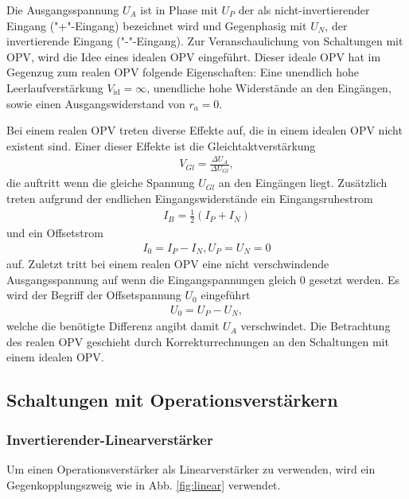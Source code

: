     Die Ausgangsspannung $U_A$ ist in Phase mit $U_P$ der als nicht-invertierender Eingang ("+"-Eingang) bezeichnet wird und Gegenphasig mit $U_N$, der invertierende Eingang ("-"-Eingang).
    Zur Veranschaulichung von Schaltungen mit OPV, wird die Idee eines idealen OPV eingeführt. Dieser ideale OPV hat im Gegenzug zum realen OPV folgende Eigenschaften:
    Eine unendlich hohe Leerlaufverstärkung $V_{\mathrm{id}}=\infty$, unendliche hohe Widerstände an den Eingängen, sowie einen Ausgangswiderstand von $r_a=0$.

    Bei einem realen OPV treten diverse Effekte auf, die in einem idealen OPV nicht existent sind.
    Einer dieser Effekte ist die Gleichtaktverstärkung
    \begin{align}
        V_{Gl} = \frac{\Delta U_A}{\Delta U_{Gl}},
    \end{align}
    die auftritt wenn die gleiche Spannung $U_{Gl}$ an den Eingängen liegt.
    Zusätzlich treten aufgrund der endlichen Eingangswiderstände ein Eingangsruhestrom
    \begin{align}
        I_B = \frac{1}{2}(I_P + I_N)
    \end{align}
    und ein Offsetstrom
    \begin{align}
        I_0 = I_P - I_N, U_P=U_N=0
    \end{align}
    auf.
    Zuletzt tritt bei einem realen OPV eine nicht verschwindende Ausgangsspannung auf wenn die Eingangspannungen gleich 0 gesetzt werden.
    Es wird der Begriff der Offsetspannung $U_0$ eingeführt
    \begin{align}
        U_0 = U_P - U_N,
    \end{align}
    welche die benötigte Differenz angibt damit $U_A$ verschwindet.
    Die Betrachtung des realen OPV geschieht durch Korrekturrechnungen an den Schaltungen mit einem idealen OPV.

    \subsection{Schaltungen mit Operationsverstärkern}
    \subsubsection{Invertierender-Linearverstärker}
    
    Um einen Operationsverstärker als Linearverstärker zu verwenden, wird ein Gegenkopplungszweig wie in Abb. \ref{fig:linear} verwendet.

